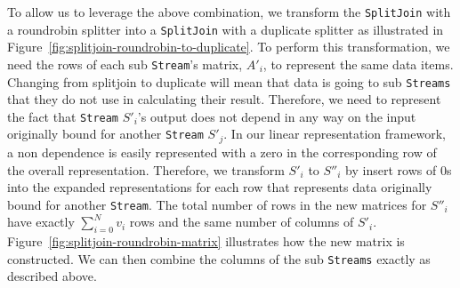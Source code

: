 To allow us to leverage the above combination, we transform the {\tt SplitJoin} with a roundrobin
splitter into a {\tt SplitJoin} with a duplicate splitter as illustrated in 
Figure~\ref{fig:splitjoin-roundrobin-to-duplicate}. To perform this transformation, we need the rows
of each sub {\tt Stream}'s matrix, $A'_i$, to represent the same data items. Changing from splitjoin to 
duplicate will mean that data is going to sub {\tt Streams} that they do not use in calculating their
result. Therefore, we need to represent the fact that {\tt Stream} $S'_i$'s output does not depend in any way on 
the input originally bound for another {\tt Stream} $S'_j$. 
In our linear representation framework, a non dependence is easily represented with a zero in the 
corresponding row of the overall representation. Therefore, we transform $S'_i$ to $S''_i$ by insert rows of $0$s 
into the expanded representations for each row that represents data originally bound for another {\tt Stream}. The
total number of rows in the new matrices for $S''_i$ have exactly $\sum_{i=0}^{N}v_i$ rows and the same number
of columns of $S'_i$. Figure~\ref{fig:splitjoin-roundrobin-matrix} illustrates how the new matrix is constructed.
We can then combine the columns of the sub {\tt Streams} exactly as described above.
